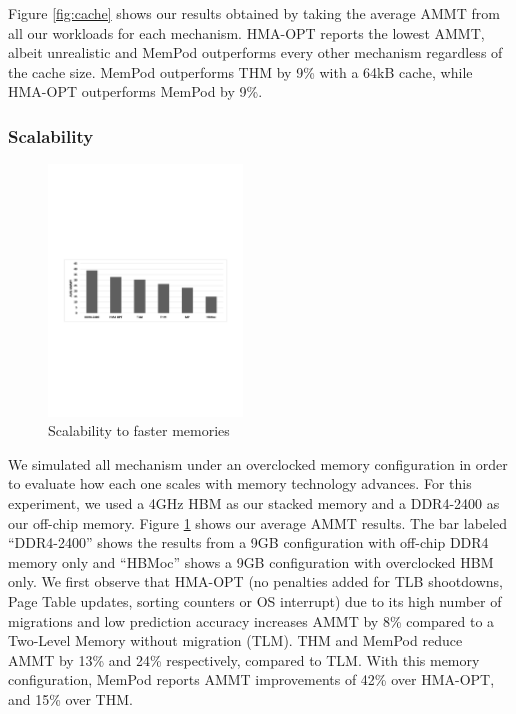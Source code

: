 
Figure \ref{fig:cache} shows our results obtained by taking the average AMMT from all our workloads for each mechanism. HMA-OPT reports the lowest AMMT, albeit unrealistic and MemPod outperforms every other mechanism regardless of the cache size. MemPod outperforms THM by 9\% with a 64kB cache, while HMA-OPT outperforms MemPod by 9\%.

\subsubsection{Scalability}

\begin{figure}
  \includegraphics[width=0.46\textwidth]{figures/scalability.pdf}
  \caption{Scalability to faster memories}
  \label{fig:scalability}
\end{figure}

We simulated all mechanism under an overclocked memory configuration in order to evaluate how each one scales with memory technology advances. For this experiment, we used a 4GHz HBM as our stacked memory and a DDR4-2400 as our off-chip memory. Figure \ref{fig:scalability} shows our average AMMT results. The bar labeled ``DDR4-2400'' shows the results from a 9GB configuration with off-chip DDR4 memory only and ``HBMoc'' shows a 9GB configuration with overclocked HBM only. We first observe that HMA-OPT (no penalties added for TLB shootdowns, Page Table updates, sorting counters or OS interrupt) due to its high number of migrations and low prediction accuracy increases AMMT by 8\% compared to a Two-Level Memory without migration (TLM). THM and MemPod reduce AMMT by 13\% and 24\% respectively, compared to TLM. With this memory configuration, MemPod reports AMMT improvements of 42\% over HMA-OPT, and 15\% over THM. 

